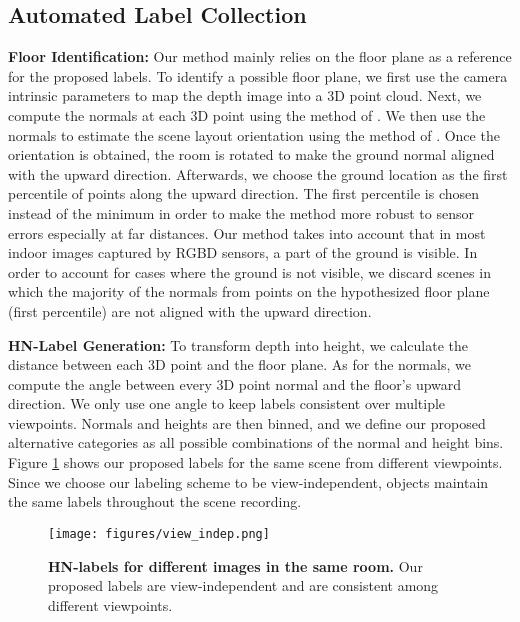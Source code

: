 \subsection{Automated Label Collection}\label{sec:data_collec}
\noindent\textbf{Floor Identification:} Our method mainly relies on the floor plane as a reference for the proposed labels. To identify a possible floor plane, we first use the  camera intrinsic parameters to map the depth image into a 3D point cloud. Next, we compute the normals at each 3D point using the method of \cite{rosman2014augmented}. We then use the normals to estimate the scene layout orientation using the method of \cite{ghanem2015robust}. Once the orientation is obtained, the room is rotated to make the ground normal aligned with the upward direction. Afterwards, we choose the ground location as the first percentile of points along the upward direction. The first percentile is chosen instead of the minimum in order to make the method more robust to sensor errors especially at far distances. Our method takes into account that in most indoor images captured by RGBD sensors, a part of the ground is visible. In order to account for cases where the ground is not visible, we discard scenes in which the majority of the normals from points on the hypothesized floor plane (first percentile) are not aligned with the upward direction.

\noindent\textbf{HN-Label Generation:} To transform depth into height, we calculate the distance between each 3D point and the floor plane. As for the normals, we compute the angle between every 3D point normal and the floor's upward direction. We only use one angle to keep labels consistent over multiple viewpoints. Normals and heights are then binned, and we define our proposed alternative categories as all possible combinations of the normal and height bins. Figure \ref{fig:view_indep} shows our proposed labels for the same scene from different viewpoints. Since we choose our labeling scheme to be view-independent, objects maintain the same labels throughout the scene recording. 

\begin{figure}[!h]
\begin{center}
\texttt{[image: figures/view\_indep.png]}
\end{center}
   \caption{\textbf{HN-labels for different images in the same room.} Our proposed labels are view-independent and are consistent among different viewpoints.}
\label{fig:view_indep}
\end{figure}

